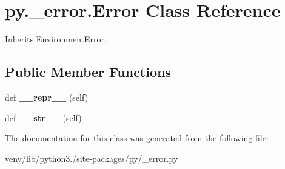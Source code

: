 \hypertarget{classpy_1_1__error_1_1_error}{}\section{py.\+\_\+error.\+Error Class Reference}
\label{classpy_1_1__error_1_1_error}


Inherits Environment\+Error.

\subsection*{Public Member Functions}
\begin{DoxyCompactItemize}
\item 
\mbox{\label{classpy_1_1__error_1_1_error_aef1966765cc5e013696adf06dd1f0740}} 
def {\bfseries \+\_\+\+\_\+repr\+\_\+\+\_\+} (self)
\item 
\mbox{\label{classpy_1_1__error_1_1_error_a36a52187a436774cf5cf26b83838ece3}} 
def {\bfseries \+\_\+\+\_\+str\+\_\+\+\_\+} (self)
\end{DoxyCompactItemize}


The documentation for this class was generated from the following file\+:\begin{DoxyCompactItemize}
\item 
venv/lib/python3./site-\/packages/py/\+\_\+error.\+py\end{DoxyCompactItemize}
